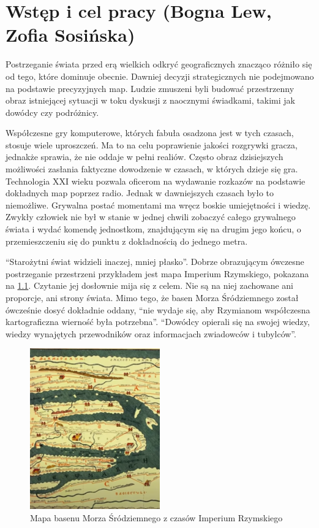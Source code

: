 \chapter{Wstęp i cel pracy (Bogna Lew, Zofia Sosińska)}\label{chap:introduction}

Postrzeganie świata przed erą wielkich odkryć geograficznych znacząco różniło się od tego, które dominuje obecnie. Dawniej
decyzji strategicznych nie podejmowano na podstawie precyzyjnych map. Ludzie zmuszeni byli  budować  przestrzenny obraz
istniejącej sytuacji  w toku dyskusji z naocznymi świadkami, takimi jak dowódcy czy podróżnicy.

Współczesne gry komputerowe, których fabuła osadzona jest w tych czasach, stosuje wiele uproszczeń. Ma to na celu poprawienie jakości
rozgrywki gracza, jednakże sprawia, że nie oddaje w pełni realiów. Często obraz dzisiejszych możliwości zasłania faktyczne dowodzenie
w czasach, w których dzieje się gra. Technologia XXI wieku pozwala oficerom na wydawanie rozkazów na podstawie dokładnych map poprzez radio.
Jednak w dawniejszych czasach było to niemożliwe. Grywalna postać momentami ma wręcz boskie umiejętności i wiedzę. Zwykły człowiek nie był w
stanie w jednej chwili zobaczyć całego grywalnego świata i wydać komendę jednostkom, znajdującym się na drugim jego końcu, o przemieszczeniu
się do punktu z dokładnością do jednego metra.

“Starożytni świat widzieli inaczej, mniej płasko”\cite{gbobrektvgry}. Dobrze obrazującym ówczesne postrzeganie przestrzeni przykładem jest mapa Imperium Rzymskiego, 
pokazana na \ref{fig:mapaIR}. Czytanie jej dosłownie mija się z celem. Nie są na niej zachowane ani proporcje, ani strony świata. Mimo tego, że 
basen Morza Śródziemnego został ówcześnie dosyć dokładnie oddany, “nie wydaje się, aby Rzymianom współczesna kartograficzna wierność była potrzebna”\cite{gbobrektvgry}. 
“Dowódcy opierali się na swojej wiedzy, wiedzy wynajętych przewodników oraz informacjach zwiadowców i tubylców”\cite{gbobrektvgry}.
\begin{figure}[htbp]
    \centering
    \includegraphics[width=0.5\textwidth]{images/mapaIR.png}
    \caption{Mapa basenu Morza Śródziemnego z czasów Imperium Rzymskiego}\label{fig:mapaIR}
\end{figure}

